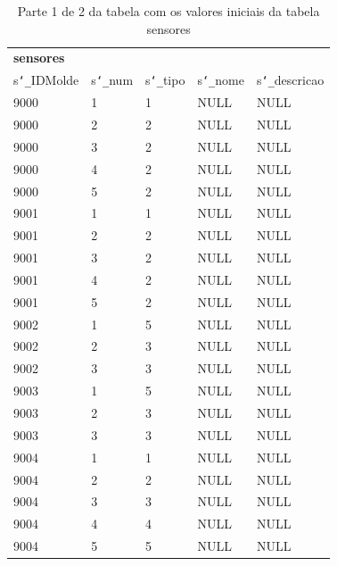 \documentclass[11pt,twoside,a4paper]{report}
\begin{document}
\begin{table}[H]
	\centering
	\begin{tabular}{|l|l|l|l|l|}
		\multicolumn{5}{l}{\textbf{sensores}}\\ \cline{1-5}
		s\texttt{\char`_}IDMolde & s\texttt{\char`_}num & s\texttt{\char`_}tipo & s\texttt{\char`_}nome & s\texttt{\char`_}descricao\\ \cline{1-5}
		9000 & 1 & 1 & NULL & NULL\\ \cline{1-5}
		9000 & 2 & 2 & NULL & NULL\\ \cline{1-5}
		9000 & 3 & 2 & NULL & NULL\\ \cline{1-5}
		9000 & 4 & 2 & NULL & NULL\\ \cline{1-5}
		9000 & 5 & 2 & NULL & NULL\\ \cline{1-5}
		9001 & 1 & 1 & NULL & NULL\\ \cline{1-5}
		9001 & 2 & 2 & NULL & NULL\\ \cline{1-5}
		9001 & 3 & 2 & NULL & NULL\\ \cline{1-5}
		9001 & 4 & 2 & NULL & NULL\\ \cline{1-5}
		9001 & 5 & 2 & NULL & NULL\\ \cline{1-5}
		9002 & 1 & 5 & NULL & NULL\\ \cline{1-5}
		9002 & 2 & 3 & NULL & NULL\\ \cline{1-5}
		9002 & 3 & 3 & NULL & NULL\\ \cline{1-5}
		9003 & 1 & 5 & NULL & NULL\\ \cline{1-5}
		9003 & 2 & 3 & NULL & NULL\\ \cline{1-5}
		9003 & 3 & 3 & NULL & NULL\\ \cline{1-5}
		9004 & 1 & 1 & NULL & NULL\\ \cline{1-5}
		9004 & 2 & 2 & NULL & NULL\\ \cline{1-5}
		9004 & 3 & 3 & NULL & NULL\\ \cline{1-5}
		9004 & 4 & 4 & NULL & NULL\\ \cline{1-5}
		9004 & 5 & 5 & NULL & NULL\\ \cline{1-5}
	\end{tabular}
	\caption[Parte 1 de 2 da tabela com os valores iniciais da tabela sensores]{Parte 1 de 2 da tabela com os valores iniciais da tabela sensores}
	\label{tab:dados5}
\end{table}
\end{document}
